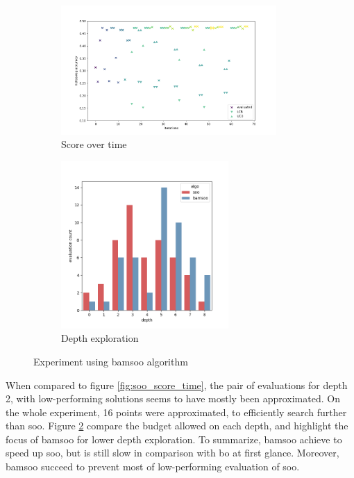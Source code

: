 \begin{figure}[h]
    \centering
    \begin{subfigure}[b]{.5\textwidth}
      \centering
      \includegraphics[width = 0.9\textwidth]{figures/bamsoo/score_evolution.png} 
      \caption{Score over time}
      \label{fig:bamsoo_score_time}
    \end{subfigure}%
    \begin{subfigure}[b]{.4\textwidth}
      \centering
      \includegraphics[width = 0.7\textwidth]{figures/bamsoo/depth_compar.png} 
      \caption{Depth exploration }
      \label{fig:bamsoo_soo_depth}
    \end{subfigure}
    \caption{Experiment using \acrshort{bamsoo} algorithm}
    \label{fig:bamsoo_res}
\end{figure}

When compared to figure \ref{fig:soo_score_time}, the pair of evaluations for depth 2, with low-performing solutions seems to have mostly been approximated. On the whole experiment, 16 points were approximated, to efficiently search further than \acrshort{soo}. Figure \ref{fig:bamsoo_soo_depth} compare the budget allowed on each depth, and highlight the focus of \acrshort{bamsoo} for lower depth exploration.
To summarize, \acrshort{bamsoo} achieve to speed up \acrshort{soo}, but is still slow in comparison with \acrshort{bo} at first glance. Moreover, \acrshort{bamsoo} succeed to prevent most of low-performing evaluation of \acrshort{soo}.








